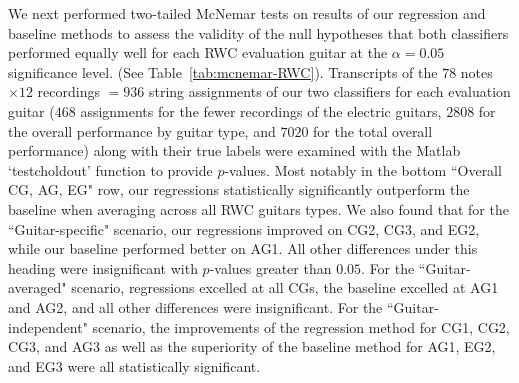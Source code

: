 \documentclass[12pt]{cmuthesis}
\begin{document}
We next performed two-tailed McNemar tests on results of our regression and baseline methods to assess the validity of the null hypotheses that both classifiers performed equally well for each RWC evaluation guitar at the $\alpha = 0.05$ significance level. (See Table~\ref{tab:mcnemar-RWC}). Transcripts of the $78$ notes $\times 12$ recordings $= 936$ string assignments of our two classifiers for each evaluation guitar ($468$ assignments for the fewer recordings of the electric guitars, $2808$ for the overall performance by guitar type, and $7020$ for the total overall performance) along with their true labels were examined with the Matlab `testcholdout' function to provide $p$-values. Most notably in the bottom ``Overall CG, AG, EG" row, our regressions statistically significantly outperform the baseline when averaging across all RWC guitars types. We also found that for the ``Guitar-specific" scenario, our regressions improved on CG2, CG3, and EG2, while our baseline performed better on AG1. All other differences under this heading were insignificant with $p$-values greater than $0.05$. For the ``Guitar-averaged" scenario, regressions excelled at all CGs, the baseline excelled at AG1 and AG2, and all other differences were insignificant. For the ``Guitar-independent" scenario, the improvements of the regression method for CG1, CG2, CG3, and AG3 as well as the superiority of the baseline method for AG1, EG2, and EG3 were all statistically significant. 
\end{document}
